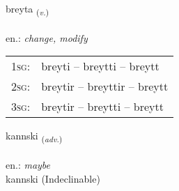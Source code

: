 \documentclass[frontgrid, backgrid]{flacards}\usepackage[]{graphicx}\usepackage[]{xcolor}
\begin{document}
\renewcommand{\blhead}{\vskip5pt {\small\bfseries\footnotesize Sagnorð | Verb }}
\renewcommand{\bcfoot}{\vskip5pt \hspace{2pt}{\small\bfseries\footnotesize 1K}}


{breyta \small{\textsubscript{(\textit{v.})}} \\[1ex] %
\textphonetic{[preiːta]} \\
en.: \emph{change, modify} \\  [2ex]
\renewcommand*{\arraystretch}{0.8}
\begin{tabular}{p{1cm}l}
\textsc{1sg}: & breyti -- breytti -- breytt \\ 
\textsc{2sg}: & breytir -- breyttir -- breytt \\ 
\textsc{3sg}: & breytir -- breytti -- breytt \\ 
\end{tabular}
}


\renewcommand{\flhead}{\vskip5pt \fboxsep=0pt {\small\bfseries\footnotesize Atviksorð | Adverb}}
\renewcommand{\fcfoot}{\vskip5pt \fboxsep=0pt \hspace{2pt}{\small\bfseries\footnotesize 1K}}

\renewcommand{\blhead}{\vskip5pt {\small\bfseries\footnotesize Atviksorð | Adverb }}
\renewcommand{\bcfoot}{\vskip5pt \hspace{2pt}{\small\bfseries\footnotesize 1K}}


{kannski \small{\textsubscript{(\textit{adv.})}} \\[1ex]
\textphonetic{[kʰanscɪ]} \\
en.: \emph{maybe} \\  [2ex]
kannski (Indeclinable)}

\renewcommand{\flhead}{\vskip5pt \fboxsep=0pt {\small\bfseries\footnotesize Nafnorð | Noun}}
\renewcommand{\fcfoot}{\vskip5pt \fboxsep=0pt \hspace{2pt}{\small\bfseries\footnotesize 1K}}

\renewcommand{\blhead}{\vskip5pt {\small\bfseries\footnotesize Nafnorð | Noun }}
\renewcommand{\bcfoot}{\vskip5pt \hspace{2pt}{\small\bfseries\footnotesize 1K}}
\end{document}
